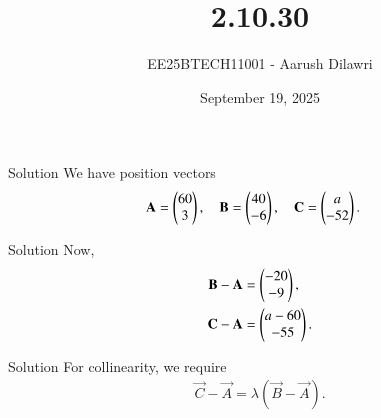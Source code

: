 \documentclass{beamer}
\title{2.10.30}
\date{September 19, 2025}
\author{EE25BTECH11001 - Aarush Dilawri}
\begin{document}
\frame{\titlepage}

\begin{frame}{Solution}
We have position vectors
\begin{align}
\mathbf{A} &= \begin{pmatrix}60 \\ 3\end{pmatrix}, \quad 
\mathbf{B} = \begin{pmatrix}40 \\ -6\end{pmatrix}, \quad 
\mathbf{C} = \begin{pmatrix}a \\ -52\end{pmatrix}.
\end{align}
\end{frame}
\begin{frame}{Solution}
    Now,
    \begin{align}
    \mathbf{B} - \mathbf{A} &= \begin{pmatrix}-20 \\ -9\end{pmatrix}, \\
    \mathbf{C} - \mathbf{A} &= \begin{pmatrix}a-60 \\ -55\end{pmatrix}.
\end{align}
\end{frame}
    
\begin{frame}{Solution}
    For collinearity, we require
    \begin{align}
    \vec{C} - \vec{A} = \lambda (\vec{B} - \vec{A}).
\end{align}
\end{frame}
\end{document}
